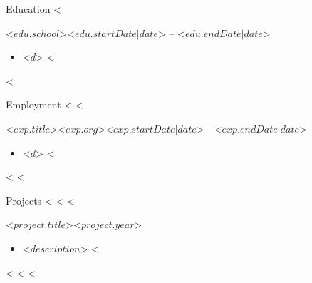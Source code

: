 \documentclass[]{mcdowellcv}
\begin{document}
	\makeheader
	

	\begin{cvsection}{Education}
		<%
		\begin{cvsubsection}{<$ edu.school $>}{}{<$ edu.startDate | date $> -- <$ edu.endDate | date $>}
			\begin{itemize}
					<%
				\item <$ d $>
					<%
			\end{itemize}
		\end{cvsubsection}
		<%
	\end{cvsection}

	\begin{cvsection}{Employment}
		<%
		<%
		\begin{cvsubsection}{<$ exp.title $>}{<$ exp.org $>}{<$ exp.startDate | date $> - <$ exp.endDate | date $>}
			\begin{itemize}
			<%
				\item <$ d $>
			<%
			\end{itemize}
		\end{cvsubsection}
		<%
		<%
	\end{cvsection}
		
    \begin{cvsection}{Projects}
	<%
	<%
	<%
        \begin{cvsubsection}{<$ project.title $>}{}{<$ project.year $>}
            \begin{itemize}
		<%
		\item  <$ description $>
		<%
            \end{itemize}
        \end{cvsubsection}
	<%
	<%
	<%
	\end{cvsection}

	
\end{document}
